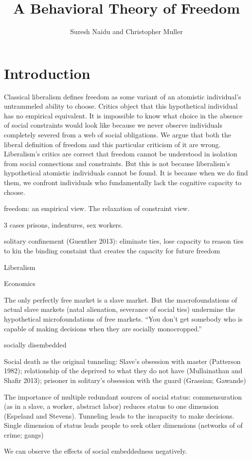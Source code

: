 \documentclass[10pt,a4paper]{article}
\title{A Behavioral Theory of Freedom}
\author{Suresh Naidu and Christopher Muller}
\begin{document}
\maketitle

\begin{abstract}
\end{abstract}

\setcounter{page}{0}
\thispagestyle{empty}

\renewcommand{\baselinestretch}{1.4}\large\normalsize

\section*{Introduction}

\noindent Classical liberalism defines freedom as some variant of an atomistic individual's untrammeled ability to choose. Critics object that this hypothetical individual has no empirical equivalent. It is impossible to know what choice in the absence of social constraints would look like because we never observe individuals completely severed from a web of social obligations. We argue that both the liberal definition of freedom and this particular criticism of it are wrong. Liberalism's critics are correct that freedom cannot be understood in isolation from social connections and constraints. But this is not because liberalism's hypothetical atomistic individuals cannot be found. It is because when we do find them, we confront individuals who fundamentally lack the cognitive capacity to choose. 

freedom: an empirical view. The relaxation of constraint view.

3 cases
prisons, indentures, sex workers.

solitary confinement (Guenther 2013): eliminate ties, lose capacity to reason
ties to kin the binding constaint that creates the capacity for future freedom

Liberalism



Economics
 
 The only perfectly free market is a slave market. But the macrofoundations of actual slave markets 
 (natal alienation, severance of social ties) undermine the hypothetical microfoundations of free markets. 
 ``You don't get somebody who is capable of making decisions when they are socially monocropped.''
 
 socially disembedded
 
 Social death as the original tunneling: Slave's obsession with master (Patterson 1982); 
 relationship of the deprived to what they do not have (Mullainathan and Shafir 2013); prisoner 
 in solitary's obsession with the guard (Grassian; Gawande)
 
 The importance of multiple redundant sources of social status: commensuration (as in a slave, a worker, 
 abstract labor) reduces status to one dimension (Espeland and Stevens). Tunneling leads to the incapacity 
 to make decisions. Single dimension of status leads people to seek other dimensions (networks of 
 of crime; gangs) 
 
 We can observe the effects of social embeddedness negatively. 
 
 
 
\end{document}
